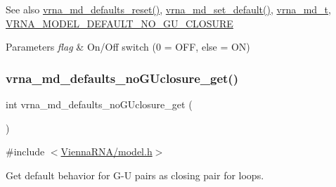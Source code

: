 \begin{DoxySeeAlso}{See also}
\mbox{\hyperlink{group__model__details_ga70834424cf804d149937de89f80ceb45}{vrna\+\_\+md\+\_\+defaults\+\_\+reset()}}, \mbox{\hyperlink{group__model__details_ga8ac6ff84936282436f822644bf841f66}{vrna\+\_\+md\+\_\+set\+\_\+default()}}, \mbox{\hyperlink{group__model__details_ga1f8a10e12a0a1915f2a4eff0b28ea17c}{vrna\+\_\+md\+\_\+t}}, \mbox{\hyperlink{group__model__details_ga5308de46faaca4b9fd16045864901ee7}{V\+R\+N\+A\+\_\+\+M\+O\+D\+E\+L\+\_\+\+D\+E\+F\+A\+U\+L\+T\+\_\+\+N\+O\+\_\+\+G\+U\+\_\+\+C\+L\+O\+S\+U\+RE}} 
\end{DoxySeeAlso}

\begin{DoxyParams}{Parameters}
{\em flag} & On/\+Off switch (0 = O\+FF, else = ON) \\
\hline
\end{DoxyParams}
\mbox{\label{group__model__details_ga4f7fdad083243a5348d63320ddaa70f3}} 
\subsubsection{\texorpdfstring{vrna\+\_\+md\+\_\+defaults\+\_\+no\+G\+Uclosure\+\_\+get()}{vrna\_md\_defaults\_noGUclosure\_get()}}
{\footnotesize\ttfamily int vrna\+\_\+md\+\_\+defaults\+\_\+no\+G\+Uclosure\+\_\+get (\begin{DoxyParamCaption}\item[{void}]{ }\end{DoxyParamCaption})}



{\ttfamily \#include $<$\mbox{\hyperlink{model_8h}{Vienna\+R\+N\+A/model.\+h}}$>$}



Get default behavior for G-\/U pairs as closing pair for loops. 

